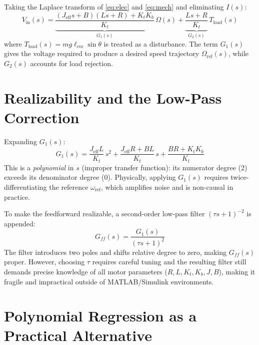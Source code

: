 \documentclass[10pt,twocolumn]{article}
\begin{document}
Taking the Laplace transform of \eqref{eq:elec} and \eqref{eq:mech}
and eliminating $I(s)$:
\begin{equation}
  V_{\mathrm{in}}(s)
    = \underbrace{\frac{(J_{\mathrm{eff}}s+B)(Ls+R)+K_tK_b}{K_t}}_{G_1(s)}\,\Omega(s)
    + \underbrace{\frac{Ls+R}{K_t}}_{G_2(s)}\,T_{\mathrm{load}}(s)
  \label{eq:laplace_inv}
\end{equation}
where $T_{\mathrm{load}}(s) = mg\ell_{cm}\sin\theta$ is treated as a
disturbance. The term $G_1(s)$ gives the voltage required to produce a
desired speed trajectory $\Omega_{\mathrm{ref}}(s)$, while $G_2(s)$
accounts for load rejection.

\section{Realizability and the Low-Pass Correction}

Expanding $G_1(s)$:
\begin{equation}
  G_1(s) = \frac{J_{\mathrm{eff}}L}{K_t}\,s^2
          + \frac{J_{\mathrm{eff}}R + BL}{K_t}\,s
          + \frac{BR + K_tK_b}{K_t}
  \label{eq:g1}
\end{equation}
This is a \emph{polynomial} in $s$ (improper transfer function): its
numerator degree (2) exceeds its denominator degree (0).
Physically, applying $G_1(s)$ requires twice-differentiating the
reference $\omega_{\mathrm{ref}}$, which amplifies noise and is
non-causal in practice.

To make the feedforward realizable, a second-order low-pass filter
$(\tau s+1)^{-2}$ is appended:
\begin{equation}
  G_{ff}(s) = \frac{G_1(s)}{(\tau s+1)^2}
  \label{eq:gff}
\end{equation}
The filter introduces two poles and shifts relative degree to zero,
making $G_{ff}(s)$ proper. However, choosing $\tau$ requires careful
tuning and the resulting filter still demands precise knowledge of all
motor parameters ($R,L,K_t,K_b,J,B$), making it fragile and
impractical outside of MATLAB/Simulink environments.

\section{Polynomial Regression as a Practical Alternative}
\end{document}
